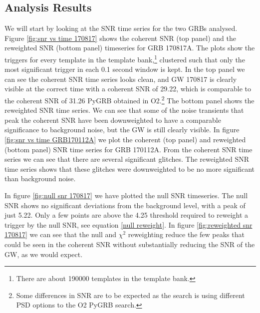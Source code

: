 \documentclass[11pt]{cuthesis}
\begin{document}
\subsection{Analysis Results}
We will start by looking at the SNR time series for the two GRBs analysed. Figure \ref{fig:snr vs time 170817} shows the coherent SNR (top panel) and the reweighted SNR (bottom panel) timeseries for GRB 170817A. The plots show the triggers for every template in the template bank,\footnote{There are about 190000 templates in the template bank.} clustered such that only the most significant trigger in each 0.1 second window is kept. In the top panel we can see the coherent SNR time series looks clean, and GW 170817 is clearly visible at the correct time with a coherent SNR of 29.22, which is comparable to the coherent SNR of 31.26 PyGRB obtained in O2.\footnote{Some differences in SNR are to be expected as the search is using different PSD options to the O2 PyGRB search.} The bottom panel shows the reweighted SNR time series. We can see that some of the noise transients that peak the coherent SNR have been downweighted to have a comparable significance to background noise, but the GW is still clearly visible. In figure \ref{fig:snr vs time GRB170112A} we plot the coherent (top panel) and reweighted (bottom panel) SNR time series for GRB 170112A. From the coherent SNR time series we can see that there are several significant glitches. The reweighted SNR time series shows that these glitches were downweighted to be no more significant than background noise. 


In figure \ref{fig:null snr 170817} we have plotted the null SNR timeseries. The null SNR shows no significant deviations from the background level, with a peak of just 5.22. Only a few points are above the 4.25 threshold required to reweight a trigger by the null SNR, see equation \ref{null reweight}. In figure \ref{fig:reweighted snr 170817} we can see that the null and $\chi^2$ reweighting reduce the few peaks that could be seen in the coherent SNR without substantially reducing the SNR of the GW, as we would expect.
\end{document}
